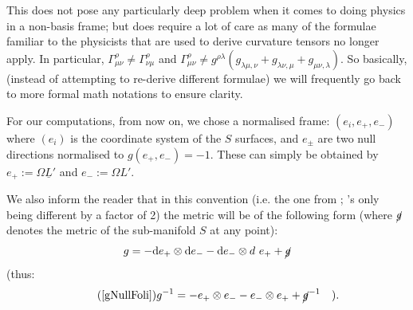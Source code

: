 \documentclass[a4paper,11pt]{article}
\numberwithin{equation}{section}
\theoremstyle{definition}
\renewcommand{\d}{{\mathrm{d}}}
\begin{document}
This does not pose any particularly deep problem when it comes to doing physics in a non-basis frame; but does require a lot of care as many of the formulae familiar to the physicists that are used to derive curvature tensors no longer apply. In particular, $\Gamma_{\mu\nu}^\rho\ne\Gamma_{\nu\mu}^\rho$ and $\Gamma_{\mu\nu}^\rho\ne g^{\rho\lambda}(g_{\lambda\mu,\nu}+g_{\lambda\nu,\mu}+g_{\mu\nu,\lambda})$. So basically, (instead of attempting to re-derive different formulae) we will frequently go back to more formal math notations to ensure clarity.

For our computations, from now on, we chose a normalised frame: $(e_i,e_+,e_-)$ where $(e_i)$ is the coordinate system of the $S$ surfaces, and $e_\pm$ are two null directions normalised to $g(e_+,e_-)=-1$. These can simply be obtained by $e_+:=\Omega\underline{L}'$ and $e_-:=\Omega L'$.

We also inform the reader that in this convention (i.e. the one from \cite{Art}; \cite{Chris}'s only being different by a factor of 2) the metric will be of the following form (where $\cancel{g}$ denotes the metric of the sub-manifold $S$ at any point):
\begin{equation} \label{gNullFoli}
    g=-\d e_+\otimes \d e_- - \d e_-\otimes d\ e_+ + \cancel{g}
\end{equation}
(thus:
\begin{equation}\tag{\ref{gNullFoli}}
g^{-1}=-e_+\otimes e_- - e_-\otimes e_+ + \cancel{g}^{-1} \quad ).
\end{equation}
\end{document}
